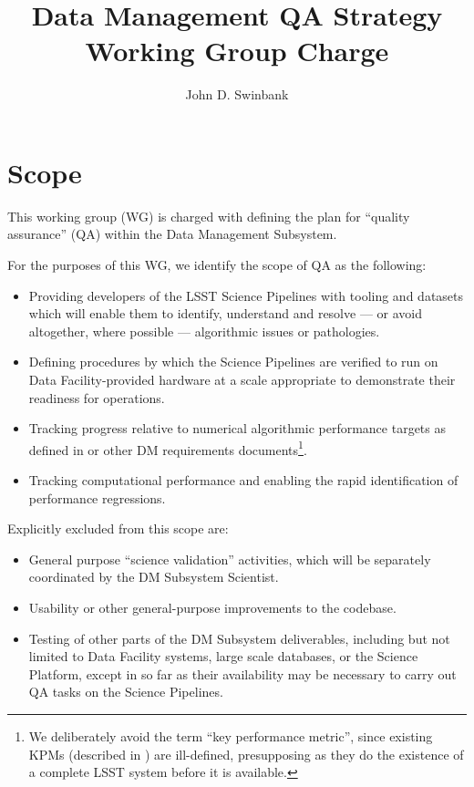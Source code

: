\documentclass[DM,toc]{lsstdoc}
\title[DM QA WG]{Data Management QA Strategy Working Group Charge}
\author{John D. Swinbank}
\begin{document}
\maketitle

\section{Scope}

This working group (WG) is charged with defining the plan for ``quality
assurance'' (QA) within the Data Management Subsystem.

For the purposes of this WG, we identify the scope of QA as the following:

\begin{itemize}

  \item{Providing developers of the LSST Science Pipelines with tooling and
  datasets which will enable them to identify, understand and resolve --- or
  avoid altogether, where possible --- algorithmic issues or pathologies.}

  \item{Defining procedures by which the Science Pipelines are verified to run
  on Data Facility-provided hardware at a scale appropriate to demonstrate
  their readiness for operations.}

  \item{Tracking progress relative to numerical algorithmic performance
  targets as defined in  or other DM requirements
  documents\footnote{We deliberately avoid the term ``key performance
  metric'', since existing KPMs (described in ) are
  ill-defined, presupposing as they do the existence of a complete LSST
  system before it is available.}.}

  \item{Tracking computational performance and enabling the rapid
  identification of performance regressions.}

\end{itemize}

Explicitly excluded from this scope are:

\begin{itemize}

  \item{General purpose ``science validation'' activities, which will be
  separately coordinated by the DM Subsystem Scientist.}

  \item{Usability or other general-purpose improvements to the codebase.}

  \item{Testing of other parts of the DM Subsystem deliverables, including but
  not limited to Data Facility systems, large scale databases, or the Science
  Platform, except in so far as their availability may be necessary to carry
  out QA tasks on the Science Pipelines.}

\end{itemize}
\end{document}
